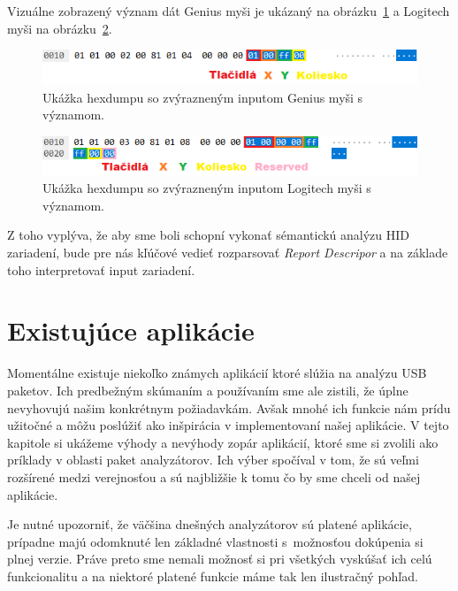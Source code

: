 Vizuálne zobrazený význam dát Genius myši je ukázaný na obrázku~\ref{obr:uvod:genius:input:vyznam} a Logitech myši na obrázku~\ref{obr:uvod:logitech:input:vyznam}.

\begin{figure}[!htb]
	\centering
	\includegraphics[width=12cm]{img/uvod_genius_input_vyznam}
	\caption{Ukážka hexdumpu so zvýrazneným inputom Genius myši s významom.}
	\label{obr:uvod:genius:input:vyznam}
\end{figure}

\begin{figure}[!htb]
	\centering
	\includegraphics[width=12cm]{img/uvod_logitech_input_vyznam}
	\caption{Ukážka hexdumpu so zvýrazneným inputom Logitech myši s významom.}
	\label{obr:uvod:logitech:input:vyznam}
\end{figure}

Z toho vyplýva, že aby sme boli schopní vykonať sémantickú analýzu HID zariadení, bude pre nás kľúčové vedieť rozparsovať \textit{Report Descripor} a na základe toho interpretovať input zariadení.

\section{Existujúce aplikácie}
\label{uvod:sec:existujuce_aplikacie}

Momentálne existuje niekoľko známych aplikácií ktoré slúžia na analýzu USB paketov. Ich predbežným skúmaním a používaním sme ale zistili, že úplne nevyhovujú našim konkrétnym požiadavkám. Avšak mnohé ich funkcie nám prídu užitočné a môžu poslúžiť ako inšpirácia v implementovaní našej aplikácie. V tejto kapitole si ukážeme výhody a nevýhody zopár aplikácií, ktoré sme si zvolili ako príklady v oblasti paket analyzátorov. Ich výber spočíval v tom, že sú veľmi rozšírené medzi verejnosťou a sú najbližšie k tomu čo by sme chceli od našej aplikácie.

Je nutné upozorniť, že väčšina dnešných analyzátorov sú platené aplikácie, prípadne majú odomknuté len základné vlastnosti s~možnosťou dokúpenia si plnej verzie. Práve preto sme nemali možnosť si pri všetkých vyskúšať ich celú funkcionalitu a na niektoré platené funkcie máme tak len ilustračný pohľad.


